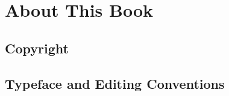 \chapter{About This Book}




\section{Copyright}




\section{Typeface and Editing Conventions}




